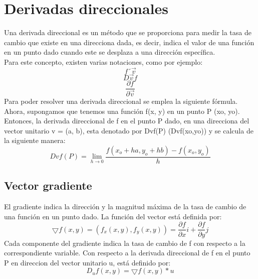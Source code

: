 \section{Derivadas direccionales}
Una derivada direccional es un método que se proporciona para medir la tasa de cambio que existe en una direcciona dada, es decir, indica el valor de una función en un punto dado cuando este se desplaza a una dirección específica.\cite{Redondo2012} \\
Para este concepto, existen varias notaciones, como por ejemplo: 
\begin{equation}
    f´\vec{v}
\end{equation}
\begin{equation}
    D\vec{v}f
\end{equation} 
\begin{equation}
    \frac{\partial f}{\partial \vec{v}}
\end{equation}
Para poder resolver una derivada direccional se emplea la siguiente fórmula. Ahora, supongamos que tenemos una función f(x, y) en un punto P (xo, yo). Entonces, la derivada direccional de f en el punto P dado, en una direcciona del vector unitario v = (a, b), esta denotado por Dvf(P) (Dvf(xo,yo)) y se calcula de la siguiente manera:
\begin{equation}
    Dvf(P) = \lim_{h\rightarrow 0} \frac{f(x_o + ha, y_o + hb) - f(x_o, y_o)}{h}
\end{equation}

\subsection{Vector gradiente}
El gradiente indica la dirección y la magnitud máxima de la tasa de cambio de una función en un punto dado. La función del vector está definida por: \cite{Redondo2012}
\begin{equation}
    \bigtriangledown f(x, y) = (f_x(x, y), f_y(x, y)) = \frac{\partial f}{\partial x}i + \frac{\partial f}{\partial y}j
\end{equation}
Cada componente del gradiente indica la tasa de cambio de f con respecto a la correspondiente variable. Con respecto a la derivada direccional de f en el punto P en direccion del vector unitario u, está definido por:
\begin{equation}
    D_uf(x, y) = \bigtriangledown f(x, y) * u
\end{equation}

